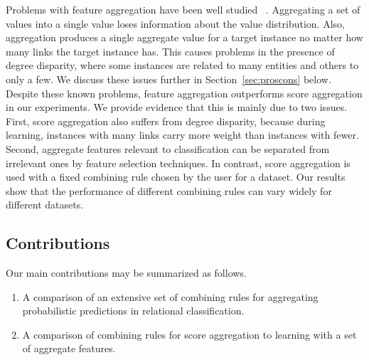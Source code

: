 \documentclass[conference]{IEEEtran}
\begin{document}
Problems with feature aggregation have been well studied~
\cite{Neville2003,Jensen2003}. Aggregating a set of values into a single value loses information about the value distribution. Also, aggregation produces a single aggregate value for a target instance no matter how many links the target instance has. This causes problems in the presence of degree disparity, where some instances are related to many entities and others to only a few. We discuss these issues further in Section~\ref{sec:proscons} below. Despite these known problems, feature aggregation outperforms score aggregation in our experiments. We provide evidence that this is mainly due to two issues. First, score aggregation also suffers from degree disparity, because during learning, instances with many links carry more weight than instances with fewer. Second,  aggregate features relevant to classification can be separated from irrelevant ones by feature selection techniques. In contrast, score aggregation is used with a fixed combining rule chosen by the user for a dataset. Our results show that the performance of different combining rules can vary widely for different datasets. %


\subsection{Contributions}
Our main contributions may be summarized as follows.

\begin{enumerate}
\item A comparison of an extensive set of combining rules for aggregating probabilistic predictions in relational classification.
\item A comparison of combining rules for score aggregation to learning with a set of aggregate features. %
\end{enumerate}
\end{document}

